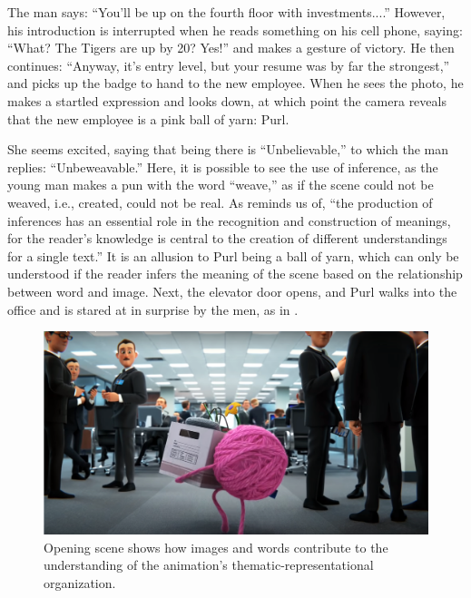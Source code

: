 \documentclass[english]{textolivre}
\begin{document}
The man says: “You’ll be up on the fourth floor with investments....” However, his introduction is interrupted when he reads something on his cell phone, saying: “What? The Tigers are up by 20? Yes!” and makes a gesture of victory. He then continues: “Anyway, it’s entry level, but your resume was by far the strongest,” and picks up the badge to hand to the new employee. When he sees the photo, he makes a startled expression and looks down, at which point the camera reveals that the new employee is a pink ball of yarn: Purl. 

She seems excited, saying that being there is “Unbelievable,” to which the man replies: “Unbeweavable.” Here, it is possible to see the use of inference, as the young man makes a pun with the word “weave,” as if the scene could not be weaved, i.e., created, could not be real. As \textcite[p. 165]{leal2011organizaccao} reminds us of, “the production of inferences has an essential role in the recognition and construction of meanings, for the reader’s knowledge is central to the creation of different understandings for a single text.” It is an allusion to Purl being a ball of yarn, which can only be understood if the reader infers the meaning of the scene based on the relationship between word and image. Next, the elevator door opens, and Purl walks into the office and is stared at in surprise by the men, as in .

\begin{figure}[htbp]
\centering
\begin{minipage}{.7\textwidth}
 \includegraphics[width=\textwidth]{Fig1.png}
 \caption{Opening scene shows how images and words contribute to the understanding of the animation’s thematic-representational organization.}
 \label{fig1}
\end{minipage}
\end{figure}
\end{document}
